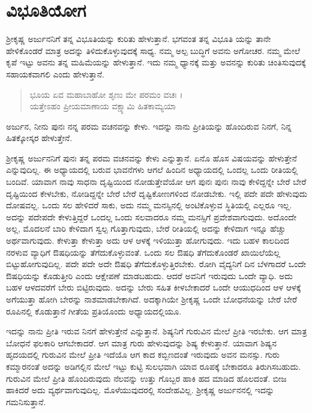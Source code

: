 
\chapter{ವಿಭೂತಿಯೋಗ}

ಶ್ರೀಕೃಷ್ಣ ಅರ್ಜುನನಿಗೆ ತನ್ನ ವಿಭೂತಿಯನ್ನು ಕುರಿತು ಹೇಳುತ್ತಾನೆ. ಭಗವಂತ ತನ್ನ ವಿಭೂತಿ ಯನ್ನು ತಾನೇ ಹೇಳಿಕೊಂಡರೆ ಮಾತ್ರ ಅದನ್ನು ತಿಳಿದುಕೊಳ್ಳುವುದಕ್ಕೆ ಸಾಧ್ಯ. ನಮ್ಮ ಅಲ್ಪ ಬುದ್ಧಿಗೆ ಅವನು ಅಗೋಚರ. ನಮ್ಮ ಮೇಲೆ ಕೃಪೆ ಇಟ್ಟು ಅವನು ತನ್ನ ಮಹಿಮೆಯನ್ನು ಹೇಳುತ್ತಾನೆ. ಇದು ನಮ್ಮ ಧ್ಯಾನಕ್ಕೆ ಮತ್ತು ಅವನನ್ನು ಕುರಿತು ಚಿಂತಿಸುವುದಕ್ಕೆ ಸಹಾಯಕವಾಗಲಿ ಎಂದು ಹೇಳುತ್ತಾನೆ.

\begin{verse}
ಭೂಯ ಏವ ಮಹಾಬಾಹೋ ಶೃಣು ಮೇ ಪರಮಂ ವಚಃ ।\\ಯತ್ತೇಽಹಂ ಪ್ರೀಯಮಾಣಾಯ ವಕ್ಷ್ಯಾಮಿ ಹಿತಕಾಮ್ಯಯಾ 
\end{verse}

{\small ಅರ್ಜುನ, ನೀನು ಪುನಃ ನನ್ನ ಪರಮ ವಚನವನ್ನು ಕೇಳು. ಇದನ್ನು ನಾನು ಪ್ರೀತಿಯನ್ನು ಹೊಂದಿರುವ ನಿನಗೆ, ನಿನ್ನ ಹಿತಕ್ಕೋಸ್ಕರ ಹೇಳುತ್ತೇನೆ.}

ಶ್ರೀಕೃಷ್ಣ ಅರ್ಜುನನಿಗೆ ಪುನಃ ತನ್ನ ಪರಮ ವಚನವನ್ನು ಕೇಳು ಎನ್ನುತ್ತಾನೆ. ಏನೊ ಹೊಸ ವಿಷಯವನ್ನು ಹೇಳುತ್ತೇನೆ ಎನ್ನುವುದಿಲ್ಲ. ಈ ಅಧ್ಯಾಯದಲ್ಲಿ ಬರುವ ಭಾವನೆಗಳು ಆಗಲೆ ಹಿಂದಿನ ಅಧ್ಯಾಯದಲ್ಲಿ ಒಂದಲ್ಲ ಒಂದು ರೀತಿಯಲ್ಲಿ ಬಂದಿವೆ. ಯಾವಾಗ ನಾವು ಸಾಧನಾ ದೃಷ್ಟಿಯಿಂದ ನೋಡುತ್ತೇವೆಯೋ ಆಗ ಪುನಃ ಪುನಃ ನಾವು ಕೇಳಿದ್ದನ್ನೇ ಬೇರೆ ಬೇರೆ ದೃಷ್ಟಿಯಿಂದ ಕೇಳಬೇಕು, ನೋಡಿದ್ದನ್ನೇ ಬೇರೆ ಬೇರೆ ದೃಷ್ಟಿಕೋಣಗಳಿಂದ ನೋಡಬೇಕು. ಇಲ್ಲಿ ಪದೇ ಪದೇ ಹೇಳುವುದು ದೋಷವಲ್ಲ. ಒಂದು ಸಲ ಹೇಳಿದರೆ ಸಾಕು, ಅದು ನಮ್ಮ ಮನಸ್ಸಿನಲ್ಲಿ ಅಂಟಿಕೊಳ್ಳುವ ಸ್ಥಿತಿಯಲ್ಲಿ ಎಲ್ಲರೂ ಇಲ್ಲ. ಅದನ್ನು ಪದೇಪದೇ ಕೇಳುತ್ತಿದ್ದರೆ ಒಂದಲ್ಲ ಒಂದು ಸಲವಾದರೂ ನಮ್ಮ ಮನಸ್ಸಿಗೆ ಪ್ರವೇಶವಾಗುವುದು. ಅದೊಂದೇ ಅಲ್ಲ, ಮೊದಲನೆ ಬಾರಿ ಕೇಳಿದಾಗ ಸ್ವಲ್ಪ ಗೊತ್ತಾಗುವುದು, ಬೇರೆ ರೀತಿಯಲ್ಲಿ ಅದನ್ನು ಕೇಳಿದಾಗ ಇನ್ನೂ ಹೆಚ್ಚು ಅರ್ಥವಾಗುವುದು. ಕೇಳುತ್ತಾ ಕೇಳುತ್ತಾ ಅದು ಆಳ ಆಳಕ್ಕೆ ಇಳಿಯುತ್ತಾ ಹೋಗುವುದು. ಇದು ಬಹಳ ಕಾಲದಿಂದ ನರಳುವ ವ್ಯಾಧಿಗೆ ಔಷಧಿಯನ್ನು ತೆಗೆದುಕೊಳ್ಳುವಂತೆ. ಒಂದು ಸಲ ಔಷಧಿ ತೆಗೆದುಕೊಂಡರೆ ಖಾಯಿಲೆಯೆಲ್ಲ ಬಿಟ್ಟುಹೋಗುವುದಿಲ್ಲ. ಪದೇ ಪದೇ ಅದೇ ಔಷಧಿ ತೆಗೆದುಕೊಳ್ಳುತ್ತಿರಬೇಕು. ರೋಗಿ ವೈದ್ಯನಿಗೆ ದಿನ ಬೆಳಗಾದರೆ ಒಂದೇ ಔಷಧಿಯನ್ನು ಕೊಡುತ್ತೀರಿ ಎಂದು ಆಕ್ಷೇಪಣೆ ಮಾಡಬಹುದು. ಆದರೆ ಅವನಿಗೆ ಇರುವುದು ಒಂದೇ ವ್ಯಾಧಿ. ಅದು ಬಹಳ ಆಳದವರೆಗೆ ಬೇರು ಬಿಟ್ಟಿರುವುದು. ಅದನ್ನು ಬೇರು ಸಹಿತ ಕೀಳಬೇಕಾದರೆ ಒಂದೇ ಆಯುಧದಿಂದ ಆಳ ಆಳಕ್ಕೆ ಅಗೆಯುತ್ತಾ ಹೋಗಿ ಬೇರನ್ನು ನಾಶಮಾಡಬೇಕಾಗಿದೆ. ಅದಕ್ಕಾಗಿಯೇ ಶ್ರೀಕೃಷ್ಣ ಒಂದೇ ಬೋಧನೆಯನ್ನು ಬೇರೆ ಬೇರೆ ರೂಪಿನಲ್ಲಿ ಕೊಡುತ್ತಾನೆ ಗೀತೆಯ ಪ್ರತಿಯೊಂದು ಅಧ್ಯಾಯದಲ್ಲಿಯೂ.

ಇದನ್ನು ನಾನು ಪ್ರೀತಿ ಇರುವ ನಿನಗೆ ಹೇಳುತ್ತೇನೆ ಎನ್ನುತ್ತಾನೆ. ಶಿಷ್ಯನಿಗೆ ಗುರುವಿನ ಮೇಲೆ ಪ್ರೀತಿ ಇರಬೇಕು. ಆಗ ಮಾತ್ರ ಬೋಧನೆ ಫಲಕಾರಿ ಆಗಬೇಕಾದರೆ. ಆಗ ಮಾತ್ರ ಗುರು ಹೇಳುವುದನ್ನು ಶಿಷ್ಯ ಕೇಳುತ್ತಾನೆ. ಯಾವಾಗ ಶಿಷ್ಯನ ಹೃದಯದಲ್ಲಿ ಗುರುವಿನ ಮೇಲೆ ಪ್ರೀತಿ ಇದೆಯೊ ಆಗ ಕಾದ ಕಬ್ಬಿಣದಂತೆ ಇರುವುದು ಅವನ ಮನಸ್ಸು. ಗುರು ಕಮ್ಮಾರನಂತೆ ಅದನ್ನು ಅಡಿಗಲ್ಲಿನ ಮೇಲೆ ಇಟ್ಟು ಕುಟ್ಟಿ ಸುಲಭವಾಗಿ ಯಾವ ರೂಪಕ್ಕೆ ಬೇಕಾದರೂ ತಿರುಗಿಸಬಹುದು. ಗುರುವಿನ ಮೇಲೆ ಪ್ರೀತಿ ಹೊಂದಿರುವುದು ನೆಲವನ್ನು ಉತ್ತು ಗೊಬ್ಬರ ಹಾಕಿ ಹದ ಮಾಡಿದ ಹೊಲದಂತೆ. ಬೀಜ ಹಾಕಿದರೆ ಅದು ವ್ಯರ್ಥವಾಗುವುದಿಲ್ಲ. ಮೊಳೆಯುವುದರಲ್ಲಿ ಸಂದೇಹವಿಲ್ಲ. ಶ್ರೀಕೃಷ್ಣ ಅರ್ಜುನನಲ್ಲಿ ಇದನ್ನು ಗಮನಿಸುತ್ತಾನೆ.

